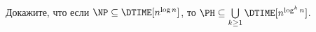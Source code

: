 Докажите, что если $\NP \subseteq \DTIME[n^{\log n}]$, то
$\PH \subseteq \bigcup\limits_{k \ge 1} \DTIME[n^{\log^k n}]$.
